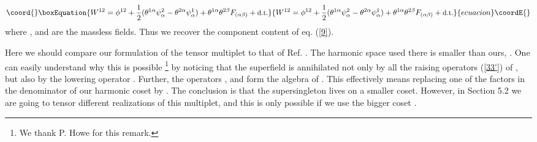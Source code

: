 \documentclass[a4paper,12pt]{article}
\begin{document}
\begin{equation}\coord{}\boxEquation{\label{39}
  W^{12} = \phi^{12} + {1\over 2}(\theta^{1\alpha}\psi^2_\alpha - 
\theta^{2\alpha}\psi^1_\alpha) + \theta^{1\alpha}\theta^{2\beta} 
F_{(\alpha\beta)} + \mbox{\small d.t.} 
}{W^{12} = \phi^{12} + {1\over 2}(\theta^{1\alpha}\psi^2_\alpha - 
\theta^{2\alpha}\psi^1_\alpha) + \theta^{1\alpha}\theta^{2\beta} 
F_{(\alpha\beta)} + \mbox{\small d.t.} 
}{ecuacion}\coordE{}\end{equation}
where \coordHE{}, \coordHE{} and 
\coordHE{} are the massless fields. 
Thus we recover the component content of eq. (\ref{9}).  

   
Here we should compare our formulation of the \coordHE{} tensor 
multiplet to that of Ref. \cite{Howe}. The harmonic space used 
there is smaller than ours, \coordHE{}. 
One can easily understand why this is possible \footnote{We thank 
P. Howe for this remark.} by noticing that the superfield \coordHE{} 
is annihilated not only by all the raising operators (\ref{33'}) 
of \coordHE{}, but also by the lowering operator \coordHE{}. Further, 
the operators \coordHE{}, \coordHE{} and \coordHE{} form the 
algebra of \coordHE{}. This effectively 
means replacing one of the factors \coordHE{} in the denominator of 
our harmonic coset \coordHE{} by \coordHE{}. 
The conclusion is that the supersingleton \coordHE{} lives on a 
smaller coset. However, in Section 5.2 we are going to tensor 
different realizations of this multiplet, and this is only 
possible if we use the bigger coset \coordHE{}.  
\end{document}
